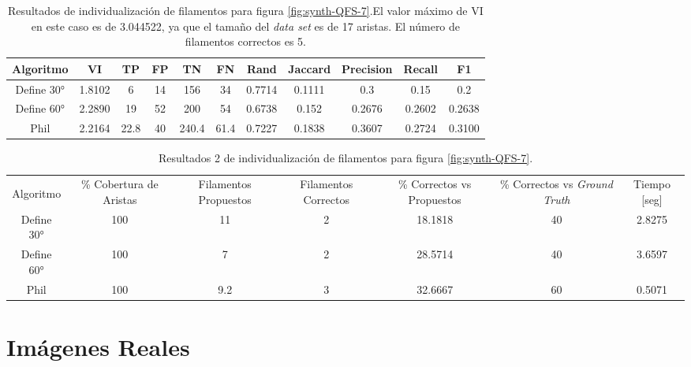 \begin{table}[h]
    \centering
    \begin{tabular}{|c|c|c|c|c|c|c|c|c|c|c|}
    \hline
        Algoritmo & VI & TP & FP &TN &FN & Rand	& Jaccard &	Precision &	Recall &	F1 \\ \hline
        Define 30° & 1.8102 & 6 & 14 & 156  & 34 & 0.7714 & 0.1111  & 0.3 & 0.15 & 0.2\\
        Define 60° & 2.2890 & 19 & 52 & 200 & 54 & 0.6738 & 0.152 & 0.2676  & 0.2602  & 0.2638\\ 
        Phil & 2.2164 & 22.8 & 40 & 240.4 & 61.4 & 0.7227 & 0.1838 & 0.3607 & 0.2724 & 0.3100\\
        \hline
    \end{tabular}
    \caption{Resultados de individualizaci\'on de filamentos para figura \ref{fig:synth-QFS-7}.El valor m\'aximo de VI en este caso es de 3.044522, ya que el tama\~no del {\it data set} es de 17 aristas. El n\'umero de filamentos correctos es 5.}
    \label{tab:synth-QFS-7-Results1}
\end{table}

\begin{table}[h]
    \centering
    \begin{tabular}{|c|c|c|c|c|c|c|}
    \hline
         & \multirow{4}{2cm}{\centering \% Cobertura de Aristas} & \multirow{4}{2cm}{Filamentos Propuestos} & \multirow{4}{2cm}{Filamentos Correctos} & \multirow{4}{2.5cm}{\% Correctos vs Propuestos} & \multirow{4}{2.5cm}{\centering \% Correctos vs {\it Ground Truth}} & \multirow{4}{1.2cm}{\centering Tiempo [seg]} \\
         &  &  &  & & &  \\
        Algoritmo &  &  &  & & &  \\
        &  &  &  & & &  \\ \hline
        Define 30° & 100 & 11 & 2 & 18.1818 & 40 & 2.8275\\
        Define 60° & 100 & 7 & 2 & 28.5714 & 40 & 3.6597\\ 
        Phil & 100 & 9.2 & 3 & 32.6667 & 60 & 0.5071\\
        \hline
    \end{tabular}
    \caption{Resultados 2 de individualizaci\'on de filamentos para figura \ref{fig:synth-QFS-7}.}
    \label{tab:synth-QFS-7-Results2}
\end{table}

\section{Im\'agenes Reales}


